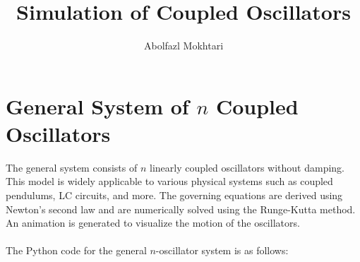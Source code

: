 \documentclass[a4paper,12pt]{article}
\title{Simulation of Coupled Oscillators}
\author{Abolfazl Mokhtari}
\begin{document}
\maketitle

\section*{General System of $n$ Coupled Oscillators}
The general system consists of \( n \) linearly coupled oscillators without damping. This model is widely applicable to various physical systems such as coupled pendulums, LC circuits, and more. The governing equations are derived using Newton's second law and are numerically solved using the Runge-Kutta method. An animation is generated to visualize the motion of the oscillators.
\\\\The Python code for the general \( n \)-oscillator system is as follows:
\end{document}
